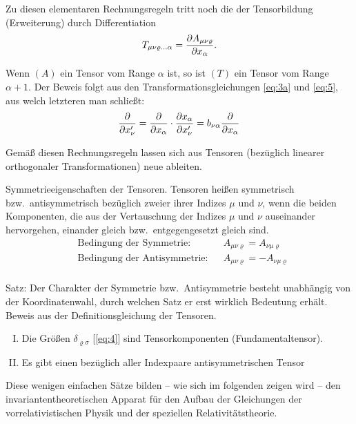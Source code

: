 Zu diesen elementaren Rechnungsregeln tritt noch die der Tensorbildung 
(Erweiterung) durch Differentiation
\begin{align}
T_{\mu\nu\varrho\ldots\alpha} = {\frac{\partial{A_{\mu\nu\varrho}}}{\partial{x_{\alpha}}}}.
\label{eq:12}
\end{align}

Wenn $(A)$ ein Tensor vom Range $\alpha$ ist, so ist $(T)$ ein Tensor vom Range 
$\alpha + 1$. Der Beweis folgt aus den Transformationsgleichungen \eqref{eq:3a} 
und \eqref{eq:5}, aus welch letzteren man schließt:
\begin{align}
{\frac{\partial{}}{\partial{x'_{\nu}}}} = 
{\frac{\partial{}}{\partial{x_{\alpha}}}} \cdot {\frac{\partial{x_{\alpha}}}{\partial{x'_{\nu}}}} = 
b_{\nu\alpha} {\frac{\partial{}}{\partial{x_{\alpha}}}}
\end{align}

Gemäß diesen Rechnungsregeln lassen sich aus Tensoren (bezüglich linearer 
orthogonaler Transformationen) neue ableiten.

Symmetrieeigenschaften der Tensoren. Tensoren heißen symmetrisch bzw.\ 
antisymmetrisch bezüglich zweier ihrer Indizes $\mu$ und $\nu$, wenn die beiden 
Komponenten, die aus der Vertauschung der Indizes $\mu$ und $\nu$ auseinander 
hervorgehen, einander gleich bzw.\ entgegengesetzt gleich sind.
\begin{align*}
&\text{Bedingung der Symmetrie:} && A_{\mu\nu\varrho} = A_{\nu\mu\varrho}
\\
&\text{Bedingung der Antisymmetrie:} && A_{\mu\nu\varrho} = -A_{\nu\mu\varrho}
\\
\end{align*}

Satz: Der Charakter der Symmetrie bzw.\ Antisymmetrie besteht unabhängig von 
der Koordinatenwahl, durch welchen Satz er erst wirklich Bedeutung erhält. 
Beweis aus der Definitionsgleichung der Tensoren.

\begin{enumerate}[I.]
\item
Die Größen $\delta_{\varrho\sigma}$ [\cref{eq:4}] sind Tensorkomponenten 
(Fundamentaltensor).

\item
Es gibt einen bezüglich aller Indexpaare antisymmetrischen Tensor
\end{enumerate}

Diese wenigen einfachen Sätze bilden -- wie sich im folgenden zeigen wird -- 
den invariantentheoretischen Apparat für den Aufbau der Gleichungen der 
vorrelativistischen Physik und der speziellen Relativitätstheorie.


